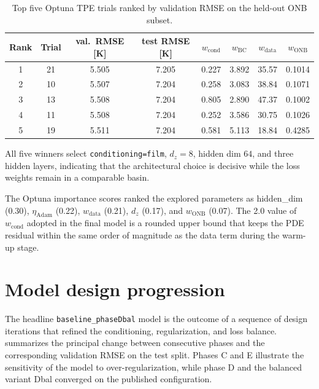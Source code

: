 \documentclass[11pt, a4paper]{article}
\begin{document}
\begin{table}[ht]
\centering
\caption{Top five Optuna TPE trials ranked by validation RMSE on
  the held-out ONB subset.}
\label{tab:supp_hpo_top5}
\small
\begin{tabular}{cccccccc}
\toprule
Rank & Trial & val.\ RMSE [K] & test RMSE [K] &
$w_{\mathrm{cond}}$ & $w_{\mathrm{BC}}$ & $w_{\mathrm{data}}$ & $w_{\mathrm{ONB}}$ \\
\midrule
1 & 21 & 5.505 & 7.205 & 0.227 & 3.892 & 35.57 & 0.1014 \\
2 & 10 & 5.507 & 7.204 & 0.258 & 3.083 & 38.84 & 0.1071 \\
3 & 13 & 5.508 & 7.204 & 0.805 & 2.890 & 47.37 & 0.1002 \\
4 & 11 & 5.508 & 7.204 & 0.252 & 3.586 & 30.75 & 0.1026 \\
5 & 19 & 5.511 & 7.204 & 0.581 & 5.113 & 18.84 & 0.4285 \\
\bottomrule
\end{tabular}

\vspace{0.5em}
All five winners select \texttt{conditioning=film}, $d_z=8$,
hidden dim $64$, and three hidden layers, indicating that the
architectural choice is decisive while the loss weights remain in
a comparable basin.
\end{table}

The Optuna importance scores ranked the explored parameters as
hidden\_dim (0.30), $\eta_{\mathrm{Adam}}$ (0.22), $w_{\mathrm{data}}$
(0.21), $d_z$ (0.17), and $w_{\mathrm{ONB}}$ (0.07). The \num{2.0}
value of $w_{\mathrm{cond}}$ adopted in the final model is a rounded
upper bound that keeps the PDE residual within the same order of
magnitude as the data term during the warm-up stage.

\section{Model design progression}\label{sec:supp_phases}

The headline \texttt{baseline\_phaseDbal} model is the outcome of a
sequence of design iterations that refined the conditioning,
regularization, and loss balance.  summarizes
the principal change between consecutive phases and the corresponding
validation RMSE on the test split. Phases C and E illustrate the
sensitivity of the model to over-regularization, while phase D and the
balanced variant Dbal converged on the published configuration.
\end{document}
